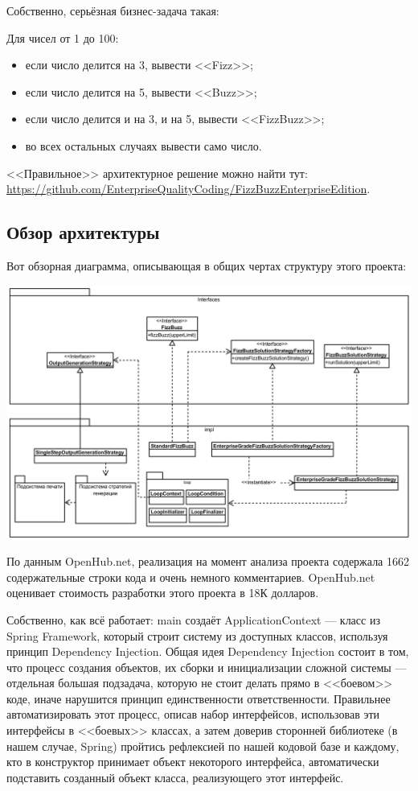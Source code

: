 \documentclass{../text-style}
\begin{document}
Собственно, серьёзная бизнес-задача такая:

Для чисел от 1 до 100:
\begin{itemize}
    \item если число делится на 3, вывести <<Fizz>>;
    \item если число делится на 5, вывести <<Buzz>>;
    \item если число делится и на 3, и на 5, вывести <<FizzBuzz>>;
    \item во всех остальных случаях вывести само число.
\end{itemize}

<<Правильное>> архитектурное решение можно найти тут: \url{https://github.com/EnterpriseQualityCoding/FizzBuzzEnterpriseEdition}.

\subsection{Обзор архитектуры}

Вот обзорная диаграмма, описывающая в общих чертах структуру этого проекта:

\begin{center}
    \includegraphics[width=\textwidth]{fizzBuzzArchitecture.png}
\end{center}

По данным OpenHub.net, реализация на момент анализа проекта содержала 1662 содержательные строки кода и очень немного комментариев. OpenHub.net оценивает стоимость разработки этого проекта в 18К долларов.

Собственно, как всё работает: main создаёт ApplicationContext --- класс из Spring Framework, который строит систему из доступных классов, используя принцип Dependency Injection. Общая идея Dependency Injection состоит в том, что процесс создания объектов, их сборки и инициализации сложной системы --- отдельная большая подзадача, которую не стоит делать прямо в <<боевом>> коде, иначе нарушится принцип единственности ответственности. Правильнее автоматизировать этот процесс, описав набор интерфейсов, использовав эти интерфейсы в <<боевых>> классах, а затем доверив сторонней библиотеке (в нашем случае, Spring) пройтись рефлексией по нашей кодовой базе и каждому, кто в конструктор принимает объект некоторого интерфейса, автоматически подставить созданный объект класса, реализующего этот интерфейс.
\end{document}

